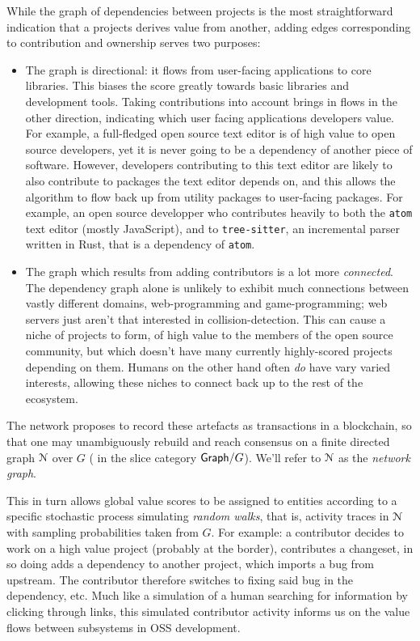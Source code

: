 
While the graph of dependencies between projects is the most straightforward
indication that a projects derives value from another, adding edges corresponding
to contribution and ownership serves two purposes:
\begin{itemize}
\item The graph is directional: it flows from user-facing applications to core
  libraries. This biases the score greatly towards basic libraries and
  development tools. Taking contributions into account brings in flows in the
  other direction, indicating which user facing applications developers
  value. For example, a full-fledged open source text editor is of high value to
  open source developers, yet it is never going to be a dependency of another
  piece of software. However, developers contributing to this text editor are
  likely to also contribute to packages the text editor depends on, and this
  allows the algorithm to flow back up from utility packages to user-facing
  packages. For example, an open source developper who contributes
  heavily to both the \texttt{atom} text editor (mostly JavaScript), and to
  \texttt{tree-sitter}, an incremental parser written in Rust, that is a
  dependency of \texttt{atom}.
\item The graph which results from adding contributors is a lot more
  \emph{connected}. The dependency graph alone is unlikely to exhibit much
  connections between vastly different domains, \eg{} web-programming and
  game-programming; web servers just aren't that interested in
  collision-detection. This can cause a niche of projects to form, of high value
  to the members of the open source community, but which doesn't have many
  currently highly-scored projects depending on them. Humans on the other hand
  often \emph{do} have vary varied interests, allowing these niches to connect
  back up to the rest of the ecosystem.
\end{itemize}

The \oscoin{} network proposes to record these artefacts as
transactions in a blockchain, so that one may unambiguously rebuild
and reach consensus on a finite directed graph $\mathcal{N}$ over $G$
(\ie{} in the slice category $\mathsf{Graph}/G$). We'll refer to $\mathcal{N}$
as the \emph{network graph}.

This in turn allows global value scores to be assigned to entities
according to a specific stochastic process simulating \emph{random
  walks}, that is, activity traces in $\mathcal{N}$ with sampling
probabilities taken from $G$. For example: a contributor decides to
work on a high value project (probably at the border), contributes a
changeset, in so doing adds a dependency to another project, which imports a
bug from upstream. The contributor therefore switches to fixing said
bug in the dependency, etc. Much like a simulation of a human
searching for information by clicking through links, this simulated
contributor activity informs us on the value flows between subsystems
in OSS development.

